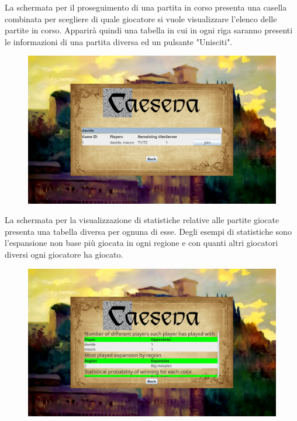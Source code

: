 La schermata per il proseguimento di una partita in corso presenta una casella combinata per scegliere di quale giocatore si vuole visualizzare l'elenco delle partite in corso. Apparirà quindi una tabella in cui in ogni riga saranno presenti le informazioni di una partita diversa ed un pulsante "Unisciti".

\begin{figure}[ht]
    \centering\includegraphics[scale=0.2]{images/gameListPage.png}
\end{figure}

La schermata per la visualizzazione di statistiche relative alle partite giocate presenta una tabella diversa per ognuna di esse. Degli esempi di statistiche sono l'espansione non base più giocata in ogni regione e con quanti altri giocatori diversi ogni giocatore ha giocato.

\begin{figure}[ht]
    \centering\includegraphics[scale=0.2]{images/statisticsPage.png}
\end{figure}

